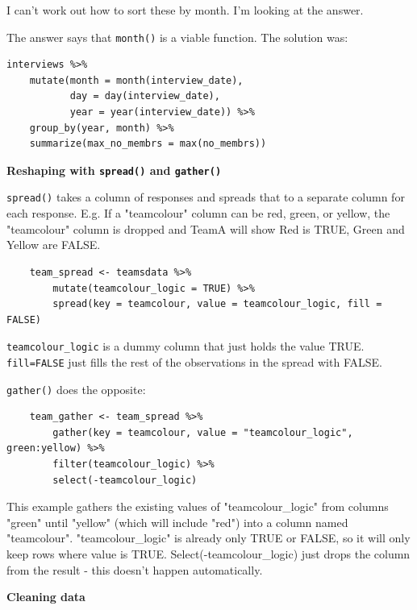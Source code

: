 \documentclass[12pt]{article}
\begin{document}
\begin{addmargin}[1cm]{0cm}
\begin{enumerate}
I can't work out how to sort these by month. I'm looking at the answer. 

The answer says that \texttt{month()} is a viable function. The solution was: \color{gray}\begin{verbatim}
interviews %>%
    mutate(month = month(interview_date),
           day = day(interview_date),
           year = year(interview_date)) %>%
    group_by(year, month) %>%
    summarize(max_no_membrs = max(no_membrs))
\end{verbatim}
\end{enumerate}

\end{addmargin}
\color{black}
\textbf{Reshaping with \texttt{spread()} and \texttt{gather()}}

\texttt{spread()} takes a column of responses and spreads that to a separate column for each response. E.g. If a "teamcolour" column can be red, green, or yellow, the "teamcolour" column is dropped and TeamA will show Red is TRUE, Green and Yellow are FALSE.
\begin{verbatim}
    team_spread <- teamsdata %>%
        mutate(teamcolour_logic = TRUE) %>%
        spread(key = teamcolour, value = teamcolour_logic, fill = FALSE)
\end{verbatim}

\texttt{teamcolour\_logic} is a dummy column that just holds the value TRUE. \texttt{fill=FALSE} just fills the rest of the observations in the spread with FALSE.

\vspace{2em}
\texttt{gather()} does the opposite:
\vspace{-1.5em}\begin{verbatim}
    team_gather <- team_spread %>%
        gather(key = teamcolour, value = "teamcolour_logic", green:yellow) %>%
        filter(teamcolour_logic) %>%
        select(-teamcolour_logic)
\end{verbatim}

This example gathers the existing values of "teamcolour\_logic" from columns "green" until "yellow" (which will include "red") into a column named "teamcolour". "teamcolour\_logic" is already only TRUE or FALSE, so it will only keep rows where value is TRUE. Select(-teamcolour\_logic) just drops the column from the result - this doesn't happen automatically.

\textbf{Cleaning data}


\newpage
\end{document}
